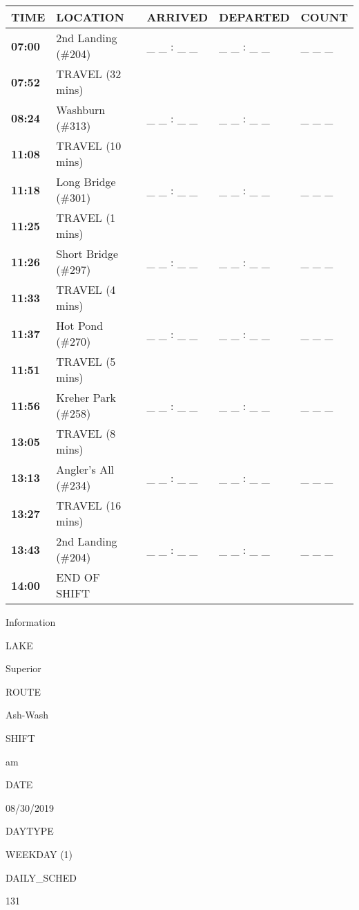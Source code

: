 \documentclass[]{article}
\begin{document}
\begin{tabular}{>{\bfseries}lllll}
\toprule
\textbf{TIME} & \textbf{LOCATION} & \textbf{ARRIVED} & \textbf{DEPARTED} & \textbf{COUNT}\\
\midrule
07:00 & 2nd Landing (\#204) & \_ \_ : \_ \_ & \_ \_ : \_ \_ & \_ \_ \_\\
07:52 & TRAVEL (32 mins) &  &  & \\
08:24 & Washburn (\#313) & \_ \_ : \_ \_ & \_ \_ : \_ \_ & \_ \_ \_\\
11:08 & TRAVEL (10 mins) &  &  & \\
11:18 & Long Bridge (\#301) & \_ \_ : \_ \_ & \_ \_ : \_ \_ & \_ \_ \_\\
11:25 & TRAVEL (1 mins) &  &  & \\
11:26 & Short Bridge (\#297) & \_ \_ : \_ \_ & \_ \_ : \_ \_ & \_ \_ \_\\
11:33 & TRAVEL (4 mins) &  &  & \\
11:37 & Hot Pond (\#270) & \_ \_ : \_ \_ & \_ \_ : \_ \_ & \_ \_ \_\\
11:51 & TRAVEL (5 mins) &  &  & \\
11:56 & Kreher Park (\#258) & \_ \_ : \_ \_ & \_ \_ : \_ \_ & \_ \_ \_\\
13:05 & TRAVEL (8 mins) &  &  & \\
13:13 & Angler's All (\#234) & \_ \_ : \_ \_ & \_ \_ : \_ \_ & \_ \_ \_\\
13:27 & TRAVEL (16 mins) &  &  & \\
13:43 & 2nd Landing (\#204) & \_ \_ : \_ \_ & \_ \_ : \_ \_ & \_ \_ \_\\
14:00 & END OF SHIFT &  &  & \\
\bottomrule
\end{tabular}\newpage

Information

LAKE

Superior

ROUTE

Ash-Wash

SHIFT

am

DATE

08/30/2019

DAYTYPE

WEEKDAY (1)

DAILY\_SCHED

131

\vspace{24pt}
\end{document}
